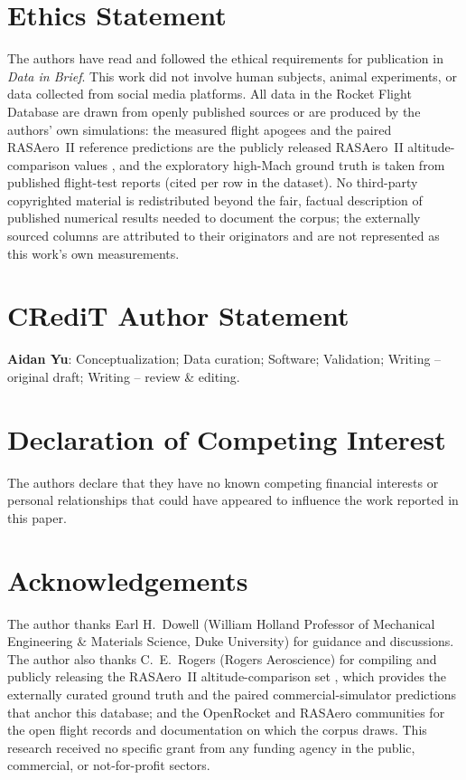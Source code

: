 
\section*{Ethics Statement}
The authors have read and followed the ethical requirements for publication in
\textit{Data in Brief}. This work did not involve human subjects, animal
experiments, or data collected from social media platforms. All data in the
Rocket Flight Database are drawn from openly published sources or are produced
by the authors' own simulations: the measured flight apogees and the paired
RASAero~II \cite{rogers2015} reference predictions are the publicly released
RASAero~II altitude-comparison values \cite{rogers_rasaero_alt}, and the
exploratory high-Mach ground truth is taken from published flight-test reports
(cited per row in the dataset). No third-party copyrighted material is
redistributed beyond the fair, factual description of published numerical
results needed to document the corpus; the externally sourced columns are
attributed to their originators and are not represented as this work's own
measurements.

\section*{CRediT Author Statement}
\textbf{Aidan Yu}: Conceptualization; Data curation; Software; Validation;
Writing -- original draft; Writing -- review \& editing.

\section*{Declaration of Competing Interest}
The authors declare that they have no known competing financial interests or
personal relationships that could have appeared to influence the work reported
in this paper.

\section*{Acknowledgements}
The author thanks Earl H.~Dowell (William Holland Professor of Mechanical
Engineering \& Materials Science, Duke University) for guidance and discussions.
The author also thanks C.~E.~Rogers (Rogers Aeroscience) for compiling and publicly
releasing the RASAero~II altitude-comparison set \cite{rogers2015,rogers_rasaero_alt},
which provides the externally curated ground truth and the paired
commercial-simulator predictions that anchor this database; and the OpenRocket
\cite{niskanen2009} and RASAero communities for the open flight records and
documentation on which the corpus draws. This research received no specific grant from any funding agency in the
public, commercial, or not-for-profit sectors.

